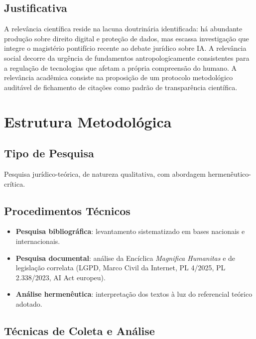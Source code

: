 \documentclass[12pt,a4paper]{article}
\begin{document}
\subsection{Justificativa}

A relevância científica reside na lacuna doutrinária identificada: há abundante produção sobre direito digital e proteção de dados, mas escassa investigação que integre o magistério pontifício recente ao debate jurídico sobre IA. A relevância social decorre da urgência de fundamentos antropologicamente consistentes para a regulação de tecnologias que afetam a própria compreensão do humano. A relevância acadêmica consiste na proposição de um protocolo metodológico auditável de fichamento de citações como padrão de transparência científica.

\section{Estrutura Metodológica}

\subsection{Tipo de Pesquisa}

Pesquisa jurídico-teórica, de natureza qualitativa, com abordagem hermenêutico-crítica.

\subsection{Procedimentos Técnicos}

\begin{itemize}
\item \textbf{Pesquisa bibliográfica}: levantamento sistematizado em bases nacionais e internacionais.
\item \textbf{Pesquisa documental}: análise da Encíclica \textit{Magnifica Humanitas} e de legislação correlata (LGPD, Marco Civil da Internet, PL 4/2025, PL 2.338/2023, AI Act europeu).
\item \textbf{Análise hermenêutica}: interpretação dos textos à luz do referencial teórico adotado.
\end{itemize}

\subsection{Técnicas de Coleta e Análise}
\end{document}
